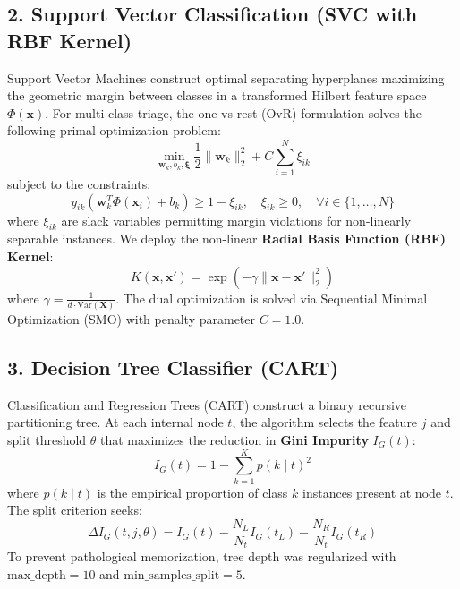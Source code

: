 \documentclass[12pt,a4paper,oneside]{report}
\begin{document}
\subsection{2. Support Vector Classification (SVC with RBF Kernel)}
Support Vector Machines construct optimal separating hyperplanes maximizing the geometric margin between classes in a transformed Hilbert feature space $\Phi(\mathbf{x})$. For multi-class triage, the one-vs-rest (OvR) formulation solves the following primal optimization problem:
\begin{equation}
    \min_{\mathbf{w}_k, b_k, \boldsymbol{\xi}} \frac{1}{2} \|\mathbf{w}_k\|_2^2 + C \sum_{i=1}^N \xi_{ik}
\end{equation}
subject to the constraints:
\begin{equation}
    y_{ik} (\mathbf{w}_k^T \Phi(\mathbf{x}_i) + b_k) \ge 1 - \xi_{ik}, \quad \xi_{ik} \ge 0, \quad \forall i \in \{1, \dots, N\}
\end{equation}
where $\xi_{ik}$ are slack variables permitting margin violations for non-linearly separable instances. We deploy the non-linear \textbf{Radial Basis Function (RBF) Kernel}:
\begin{equation}
    K(\mathbf{x}, \mathbf{x}') = \exp\left( -\gamma \|\mathbf{x} - \mathbf{x}'\|_2^2 \right)
    \label{eq:rbf_kernel}
\end{equation}
where $\gamma = \frac{1}{d \cdot \text{Var}(\mathbf{X})}$. The dual optimization is solved via Sequential Minimal Optimization (SMO) with penalty parameter $C = 1.0$.

\subsection{3. Decision Tree Classifier (CART)}
Classification and Regression Trees (CART) construct a binary recursive partitioning tree. At each internal node $t$, the algorithm selects the feature $j$ and split threshold $\theta$ that maximizes the reduction in \textbf{Gini Impurity} $I_G(t)$:
\begin{equation}
    I_G(t) = 1 - \sum_{k=1}^K p(k \mid t)^2
    \label{eq:gini_impurity}
\end{equation}
where $p(k \mid t)$ is the empirical proportion of class $k$ instances present at node $t$. The split criterion seeks:
\begin{equation}
    \Delta I_G(t, j, \theta) = I_G(t) - \frac{N_L}{N_t} I_G(t_L) - \frac{N_R}{N_t} I_G(t_R)
\end{equation}
To prevent pathological memorization, tree depth was regularized with $\text{max\_depth} = 10$ and $\text{min\_samples\_split} = 5$.
\end{document}
